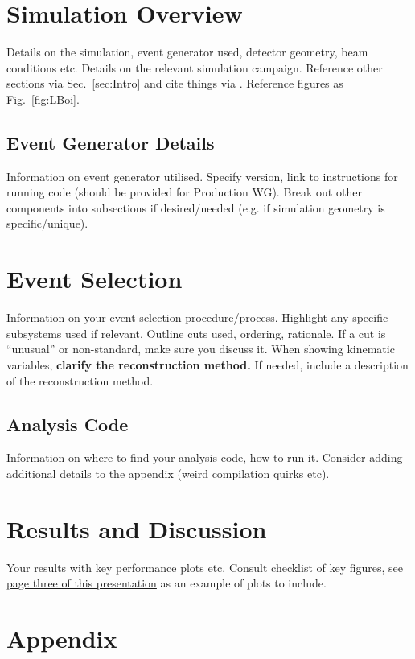 \documentclass[letterpaper,12pt]{article}
\begin{document}
\section{Simulation Overview}\label{sec:Sim_Overview}

Details on the simulation, event generator used, detector geometry, beam conditions etc. Details on the relevant simulation campaign. Reference other sections via Sec.~\ref{sec:Intro} and cite things via \cite{jr:2022_YR}. Reference figures as Fig.~\ref{fig:LBoi}.

\subsection{Event Generator Details}\label{subsec:EvGen}

Information on event generator utilised. Specify version, link to instructions for running code (should be provided for Production WG). Break out other components into subsections if desired/needed (e.g. if simulation geometry is specific/unique).

\section{Event Selection}\label{sec:EvSelect}

Information on your event selection procedure/process. Highlight any specific subsystems used if relevant. Outline cuts used, ordering, rationale. If a cut is ``unusual'' or non-standard, make sure you discuss it. When showing kinematic variables, \textbf{clarify the reconstruction method.} If needed, include a description of the reconstruction method.

\subsection{Analysis Code}\label{subsec:Analysis_Code}

Information on where to find your analysis code, how to run it. Consider adding additional details to the appendix (weird compilation quirks etc).

\section{Results and Discussion}\label{sec:Results_Discuss}

Your results with key performance plots etc. Consult checklist of key figures, see \href{https://docs.google.com/presentation/d/1bqz9_GPvPoW4oz1m8KvzuUhPJZBe_CfU5APMt0LjfaU/edit?slide=id.g3338e3f4b69_0_51#slide=id.g3338e3f4b69_0_51}{page three of this presentation} as an example of plots to include.

\pagebreak
\appendix
\section{Appendix}


 

\end{document}
